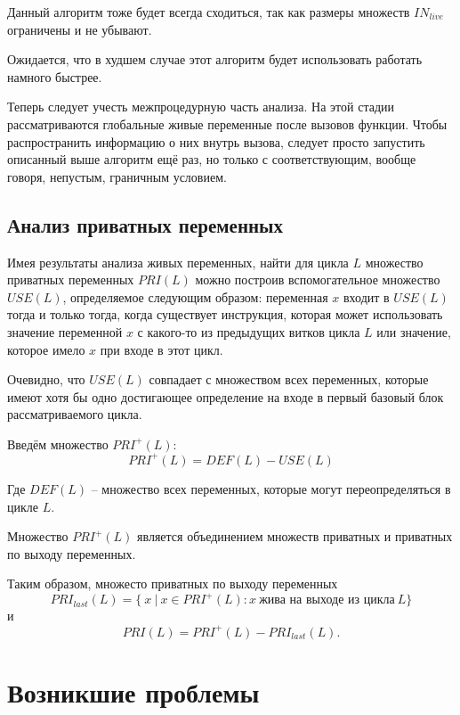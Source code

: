 \documentclass{article}
\begin{document}
Данный алгоритм тоже будет всегда сходиться, так как размеры множеств $IN_{live}$ ограничены и не убывают.


Ожидается, что в худшем случае этот алгоритм будет использовать работать намного быстрее.

Теперь следует учесть межпроцедурную часть анализа.
На этой стадии рассматриваются глобальные живые переменные после вызовов функции. Чтобы распространить информацию о них внутрь вызова, следует просто запустить
описанный выше алгоритм ещё раз, но только с соответствующим, вообще говоря, непустым, граничным условием.



\subsection{Анализ приватных переменных}

Имея результаты анализа живых переменных, найти для цикла $L$ множество приватных переменных $PRI(L)$ можно построив вспомогательное множество
$USE(L)$, определяемое следующим образом: переменная $x$ входит в $USE(L)$ тогда и только тогда, когда существует инструкция, которая может использовать значение переменной $x$ с какого-то из предыдущих витков цикла $L$ или значение, которое имело $x$ при входе в  этот цикл.

Очевидно, что $USE(L)$ совпадает с множеством всех переменных, которые имеют хотя бы одно достигающее определение на входе в первый базовый блок рассматриваемого цикла.

Введём множество $PRI^+(L)$:
\begin{equation*}
PRI^+(L) = DEF(L) - USE(L)
\end{equation*}

Где $DEF(L)$ -- множество всех переменных, которые могут переопределяться в цикле $L$.

Множество $PRI^+(L)$ является объединением множеств приватных и приватных по выходу переменных.

Таким образом, множесто приватных по выходу переменных
\begin{equation*}
PRI_{last}(L) = \{\ x\ |\ x \in PRI^+(L): x\ \text{жива на выходе из цикла}\ L\}
\end{equation*}
и
\begin{equation*}
    PRI(L) = PRI^+(L) - PRI_{last}(L).
\end{equation*}

\section{Возникшие проблемы}
\end{document}

